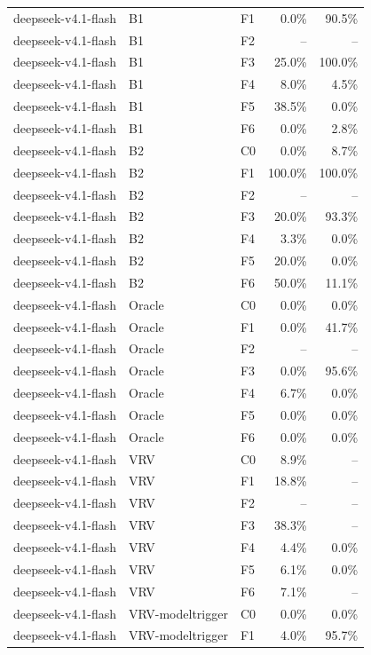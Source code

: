 \begin{tabular}{lllrr}
deepseek-v4.1-flash & B1 & F1 & 0.0\% & 90.5\% \\
deepseek-v4.1-flash & B1 & F2 & -- & -- \\
deepseek-v4.1-flash & B1 & F3 & 25.0\% & 100.0\% \\
deepseek-v4.1-flash & B1 & F4 & 8.0\% & 4.5\% \\
deepseek-v4.1-flash & B1 & F5 & 38.5\% & 0.0\% \\
deepseek-v4.1-flash & B1 & F6 & 0.0\% & 2.8\% \\
deepseek-v4.1-flash & B2 & C0 & 0.0\% & 8.7\% \\
deepseek-v4.1-flash & B2 & F1 & 100.0\% & 100.0\% \\
deepseek-v4.1-flash & B2 & F2 & -- & -- \\
deepseek-v4.1-flash & B2 & F3 & 20.0\% & 93.3\% \\
deepseek-v4.1-flash & B2 & F4 & 3.3\% & 0.0\% \\
deepseek-v4.1-flash & B2 & F5 & 20.0\% & 0.0\% \\
deepseek-v4.1-flash & B2 & F6 & 50.0\% & 11.1\% \\
deepseek-v4.1-flash & Oracle & C0 & 0.0\% & 0.0\% \\
deepseek-v4.1-flash & Oracle & F1 & 0.0\% & 41.7\% \\
deepseek-v4.1-flash & Oracle & F2 & -- & -- \\
deepseek-v4.1-flash & Oracle & F3 & 0.0\% & 95.6\% \\
deepseek-v4.1-flash & Oracle & F4 & 6.7\% & 0.0\% \\
deepseek-v4.1-flash & Oracle & F5 & 0.0\% & 0.0\% \\
deepseek-v4.1-flash & Oracle & F6 & 0.0\% & 0.0\% \\
deepseek-v4.1-flash & VRV & C0 & 8.9\% & -- \\
deepseek-v4.1-flash & VRV & F1 & 18.8\% & -- \\
deepseek-v4.1-flash & VRV & F2 & -- & -- \\
deepseek-v4.1-flash & VRV & F3 & 38.3\% & -- \\
deepseek-v4.1-flash & VRV & F4 & 4.4\% & 0.0\% \\
deepseek-v4.1-flash & VRV & F5 & 6.1\% & 0.0\% \\
deepseek-v4.1-flash & VRV & F6 & 7.1\% & -- \\
deepseek-v4.1-flash & VRV-modeltrigger & C0 & 0.0\% & 0.0\% \\
deepseek-v4.1-flash & VRV-modeltrigger & F1 & 4.0\% & 95.7\% \\

\end{tabular}
